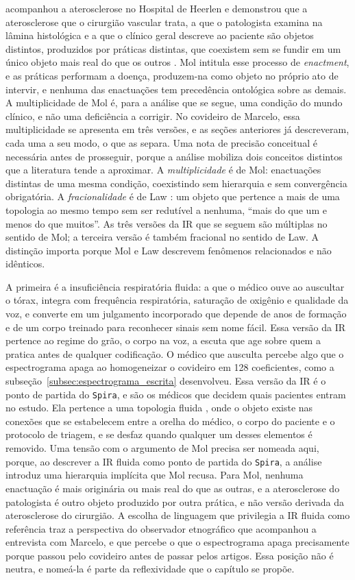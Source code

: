\textcite{mol2002body} acompanhou a aterosclerose no Hospital de Heerlen e demonstrou que a aterosclerose que o cirurgião vascular trata, a que o patologista examina na lâmina histológica e a que o clínico geral descreve ao paciente são objetos distintos, produzidos por práticas distintas, que coexistem sem se fundir em um único objeto mais real do que os outros \parencite{mol2002body}. Mol intitula esse processo de \textit{enactment}, e as práticas performam a doença, produzem-na como objeto no próprio ato de intervir, e nenhuma das enactuações tem precedência ontológica sobre as demais. A multiplicidade de Mol é, para a análise que se segue, uma condição do mundo clínico, e não uma deficiência a corrigir. No covideiro de Marcelo, essa multiplicidade se apresenta em três versões, e as seções anteriores já descreveram, cada uma a seu modo, o que as separa. Uma nota de precisão conceitual é necessária antes de prosseguir, porque a análise mobiliza dois conceitos distintos que a literatura tende a aproximar. A \textit{multiplicidade} é de Mol: enactuações distintas de uma mesma condição, coexistindo sem hierarquia e sem convergência obrigatória. A \textit{fracionalidade} é de Law \parencite{LawHassard1999ANT}: um objeto que pertence a mais de uma topologia ao mesmo tempo sem ser redutível a nenhuma, \enquote{mais do que um e menos do que muitos}. As três versões da IR que se seguem são múltiplas no sentido de Mol; a terceira versão é também fracional no sentido de Law. A distinção importa porque Mol e Law descrevem fenômenos relacionados e não idênticos.

A primeira é a insuficiência respiratória fluida: a que o médico ouve ao auscultar o tórax, integra com frequência respiratória, saturação de oxigênio e qualidade da voz, e converte em um julgamento incorporado que depende de anos de formação e de um corpo treinado para reconhecer sinais sem nome fácil. Essa versão da IR pertence ao regime do grão, o corpo na voz, a escuta que age sobre quem a pratica antes de qualquer codificação. O médico que ausculta percebe algo que o espectrograma apaga ao homogeneizar o covideiro em 128 coeficientes, como a subseção~\ref{subsec:espectrograma_escrita} desenvolveu. Essa versão da IR é o ponto de partida do \texttt{Spira}, e são os médicos que decidem quais pacientes entram no estudo. Ela pertence a uma topologia fluida \parencite{MolLaw1994}, onde o objeto existe nas conexões que se estabelecem entre a orelha do médico, o corpo do paciente e o protocolo de triagem, e se desfaz quando qualquer um desses elementos é removido. Uma tensão com o argumento de Mol precisa ser nomeada aqui, porque, ao descrever a IR fluida como ponto de partida do \texttt{Spira}, a análise introduz uma hierarquia implícita que Mol recusa. Para Mol, nenhuma enactuação é mais originária ou mais real do que as outras, e a aterosclerose do patologista é outro objeto produzido por outra prática, e não versão derivada da aterosclerose do cirurgião. A escolha de linguagem que privilegia a IR fluida como referência traz a perspectiva do observador etnográfico que acompanhou a entrevista com Marcelo, e que percebe o que o espectrograma apaga precisamente porque passou pelo covideiro antes de passar pelos artigos. Essa posição não é neutra, e nomeá-la é parte da reflexividade que o capítulo se propõe.

